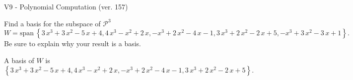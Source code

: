 \begin{exercise}
  \begin{exerciseTitle}V9 - Polynomial Computation (ver. 157)\end{exerciseTitle}
  \begin{exerciseStatement}
    Find a basis for the subspace of \(\mathcal{P}^3\) 
\[W=\mathrm{span}\ \left\{3 \, x^{3} + 3 \, x^{2} - 5 \, x + 4 , 4 \, x^{3} - x^{2} + 2 \, x , -x^{3} + 2 \, x^{2} - 4 \, x - 1 , 3 \, x^{3} + 2 \, x^{2} - 2 \, x + 5 , -x^{3} + 3 \, x^{2} - 3 \, x + 1\right\}.\]
 Be sure to explain why your result is a basis.


  \end{exerciseStatement}
  \begin{exerciseAnswer}
   A basis of \(W\) is  \(\left\{3 \, x^{3} + 3 \, x^{2} - 5 \, x + 4 , 4 \, x^{3} - x^{2} + 2 \, x , -x^{3} + 2 \, x^{2} - 4 \, x - 1 , 3 \, x^{3} + 2 \, x^{2} - 2 \, x + 5\right\}\).
  


  \end{exerciseAnswer}
\end{exercise}
